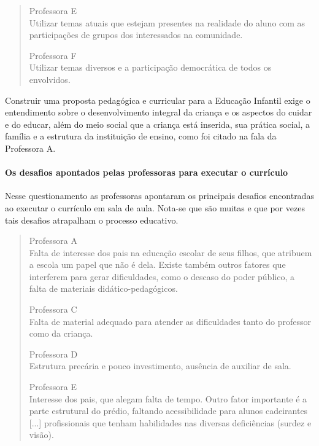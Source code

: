 \begin{refsection}
\begin{quotation}
        \negpar[-1.5em]{}Professora E\quad{}\\Utilizar temas atuais que estejam presentes na realidade do aluno com as participações de grupos dos interessados na comunidade.  
        \medskip

        \negpar[-1.5em]{}Professora F\quad{}\\Utilizar temas diversos e a participação democrática de todos os envolvidos. 
    \end{quotation}

    Construir uma proposta pedagógica e curricular para a Educação Infantil exige o entendimento sobre o desenvolvimento integral da criança e os aspectos do cuidar e do educar, além do meio social que a criança está inserida, sua prática social, a família e a estrutura da instituição de ensino, como foi citado na fala da Professora A.  

    \paragraph{Os desafios apontados pelas professoras para executar o currículo} Nesse questionamento as professoras apontaram os principais desafios encontradas ao executar o currículo em sala de aula. Nota-se que são muitas e que por vezes tais desafios atrapalham o processo educativo.   

    \begin{quotation}
        \noindent\negpar[-1.5em]{}Professora A\quad{}\\Falta de interesse dos pais na educação escolar de seus filhos, que atribuem a escola um papel que não é dela. Existe também outros fatores que interferem para gerar dificuldades, como o descaso do poder público, a falta de materiais didático-pedagógicos. 
        \medskip
    
        \negpar[-1.5em]{}Professora C\quad{}\\Falta de material adequado para atender as dificuldades tanto do professor como da criança.  
        \medskip

        \negpar[-1.5em]{}Professora D\quad{}\\Estrutura precária e pouco investimento, ausência de auxiliar de sala. 
        \medskip

        \negpar[-1.5em]{}Professora E\quad{}\\Interesse dos pais, que alegam falta de tempo. Outro fator importante é a parte estrutural do prédio, faltando acessibilidade para alunos cadeirantes [...] profissionais que tenham habilidades nas diversas deficiências (surdez e visão). 
        \medskip


\end{quotation}
\end{refsection}
